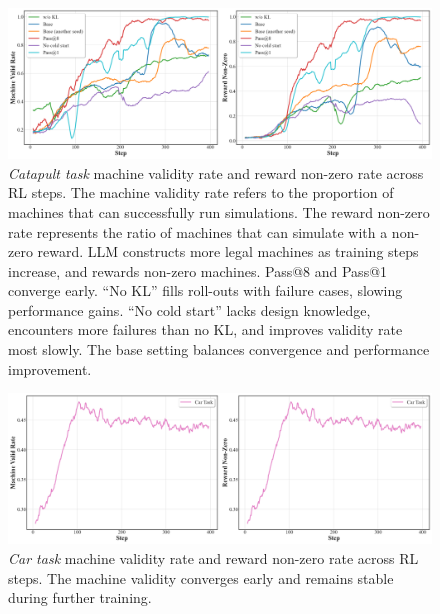 \begin{figure}[h!]
  \centering
  \includegraphics[width=\linewidth]{figures/RL_Metrics/Catapult/MachineValid_Reward.png}
  \caption{\footnotesize \textit{Catapult task} machine validity rate and reward non-zero rate across RL steps. The machine validity rate refers to the proportion of machines that can successfully run simulations. The reward non-zero rate represents the ratio of machines that can simulate with a non-zero reward. LLM constructs more legal machines as training steps increase, and rewards non-zero machines. Pass@8 and Pass@1 converge early. ``No KL'' fills roll-outs with failure cases, slowing performance gains. ``No cold start'' lacks design knowledge, encounters more failures than no KL, and improves validity rate most slowly. The base setting balances convergence and performance improvement.}
  \label{fig:RL-catapult-valid-rate}
\end{figure}


\begin{figure}[h!]
  \centering
  \includegraphics[width=\linewidth]{figures/RL_Metrics/Car/MachineValid_Reward.png}
  \caption{\footnotesize \textit{Car task} machine validity rate and reward non-zero rate across RL steps. The machine validity converges early and remains stable during further training.} \label{fig:RL-car-valid-rate}
\end{figure}


